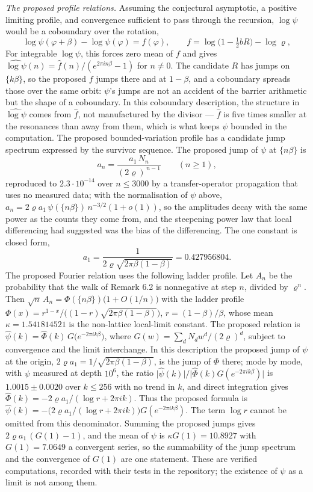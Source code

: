 \documentclass[11pt,a4paper]{article}
\begin{document}
\emph{The proposed profile relations.} Assuming the conjectural
asymptotic, a positive limiting profile, and convergence sufficient to
pass through the recursion, \(\log\psi\) would be a coboundary over the
rotation, \[
\log\psi(\varphi+\beta)-\log\psi(\varphi)=f(\varphi),\qquad
f=\log\bigl(1-\tfrac12 b R\bigr)-\log\varrho,
\] For integrable \(\log\psi\), this forces zero mean of \(f\) and gives
\(\widehat{\log\psi}(n)=\hat f(n)/(e^{2\pi in\beta}-1)\) for \(n\ne0\).
The candidate \(R\) has jumps on \(\{k\beta\}\), so the proposed \(f\)
jumps there and at \(1-\beta\), and a coboundary spreads those over the
same orbit: \(\psi\)'s jumps are not an accident of the barrier
arithmetic but the shape of a coboundary. In this coboundary
description, the structure in \(\widehat{\log\psi}\) comes from
\(\hat f\), not manufactured by the divisor --- \(\hat f\) is five times
smaller at the resonances than away from them, which is what keeps
\(\psi\) bounded in the computation. The proposed bounded-variation
profile has a candidate jump spectrum expressed by the survivor
sequence. The proposed jump of \(\psi\) at \(\{n\beta\}\) is \[
a_n=\frac{a_1\,N_n}{(2\varrho)^{\,n-1}}\qquad(n\ge1),
\] reproduced to \(2.3\cdot10^{-14}\) over \(n\le3000\) by a
transfer-operator propagation that uses no measured data; with the
normalisation of \(\psi\) above,
\(a_n=2\varrho a_1\,\psi(\{n\beta\})\,n^{-3/2}(1+o(1))\), so the
amplitudes decay with the same power as the counts they come from, and
the steepening power law that local differencing had suggested was the
bias of the differencing. The one constant is closed form, \[
a_1=\frac{1}{2\varrho\sqrt{2\pi\beta(1-\beta)}}=0.427956804.
\] The proposed Fourier relation uses the following ladder profile. Let
\(A_n\) be the probability that the walk of Remark 6.2 is nonnegative at
step \(n\), divided by \(\varrho^{n}\). Then
\(\sqrt n\,A_n=\Phi(\{n\beta\})\bigl(1+O(1/n)\bigr)\) with the ladder
profile
\(\Phi(x)=r^{1-x}\big/\bigl((1-r)\sqrt{2\pi\beta(1-\beta)}\bigr)\),
\(r=(1-\beta)/\beta\), whose mean \(\kappa=1.541814521\) is the
non-lattice local-limit constant. The proposed relation is
\(\hat\psi(k)=\hat\Phi(k)\,G\bigl(e^{-2\pi ik\beta}\bigr)\), where
\(G(w)=\sum_dN_dw^d/(2\varrho)^d\), subject to convergence and the limit
interchange. In this description the proposed jump of \(\psi\) at the
origin, \(2\varrho a_1=1/\sqrt{2\pi\beta(1-\beta)}\), is the jump of
\(\Phi\) there; mode by mode, with \(\psi\) measured at depth \(10^6\),
the ratio
\(\lvert\hat\psi(k)\rvert/\lvert\hat\Phi(k)G(e^{-2\pi ik\beta})\rvert\)
is \(1.0015\pm0.0020\) over \(k\le256\) with no trend in \(k\), and
direct integration gives \(\hat\Phi(k)=-2\varrho a_1/(\log r+2\pi ik)\).
Thus the proposed formula is
\(\hat\psi(k)=-\bigl(2\varrho a_1/(\log r+2\pi ik)\bigr)G(e^{-2\pi ik\beta})\).
The term \(\log r\) cannot be omitted from this denominator. Summing the
proposed jumps gives \(2\varrho a_1\,(G(1)-1)\), and the mean of
\(\psi\) is \(\kappa G(1)=10.8927\) with \(G(1)=7.0649\) a convergent
series, so the summability of the jump spectrum and the convergence of
\(G(1)\) are one statement. These are verified computations, recorded
with their tests in the repository; the existence of \(\psi\) as a limit
is not among them.
\end{document}
